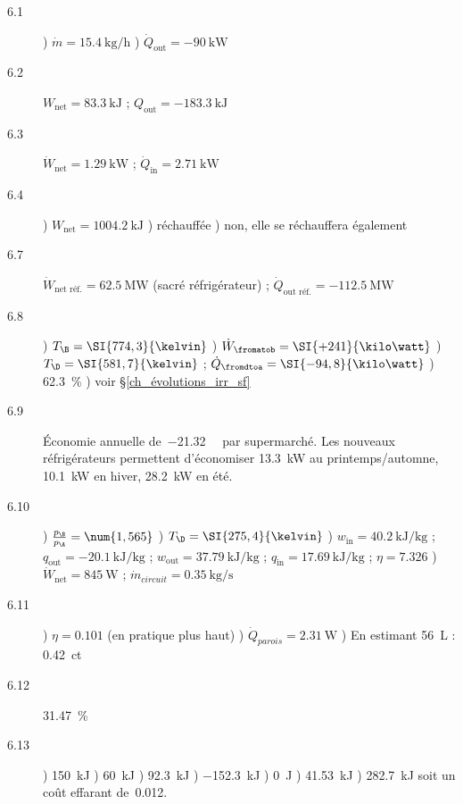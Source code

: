 	\begin{description}
		\item [6.1] ) $\dot{m} = \SI{15,4}{\kilogram\per\hour}$ 
						) $\dot{Q}_\text{out} = \SI{-90}{\kilo\watt}$
		\item [6.2] \tab ${W}_\text{net} = \SI{+83,3}{\kilo\joule}$ ; $Q_\text{out} = \SI{-183,3}{\kilo\joule}$
		\item [6.3] \tab $\dot{W}_\text{net} = \SI{+1,29}{\kilo\watt}$ ; $\dot{Q}_\text{in} = \SI{+2,71}{\kilo\watt}$
		\item [6.4]	) ${W}_\text{net} = \SI{+1004,2}{\kilo\joule}$
						) réchauffée
						) non, elle se réchauffera également
		\item [6.7] \tab $\dot{W}_\text{net réf.} = \SI{+62,5}{\mega\watt}$ (sacré réfrigérateur) ; $\dot{Q}_\text{out réf.} = \SI{-112,5}{\mega\watt}$
		\item [6.8] ) $T_\B = \SI{774,3}{\kelvin}$ 
						) $\dot{W}_\fromatob = \SI{+241}{\kilo\watt}$ 
						) $T_\D = \SI{581,7}{\kelvin}$ ; $\dot{Q}_\fromdtoa = \SI{-94,8}{\kilo\watt}$ 
						) \SI{62,3}{\percent} 
						) voir \S\ref{ch_évolutions_irr_sf}
		\item [6.9] \tab Économie annuelle de~\SI{-21,32}{\kilo\euroo} par supermarché. Les nouveaux réfrigérateurs permettent d’économiser \SI{13,3}{\kilo\watt} au printemps/automne, \SI{10,1}{\kilo\watt} en hiver, \SI{28,2}{\kilo\watt} en été.
		\item [6.10] 	) $\frac{p_\B }{p_\A} = \num{1,565}$ 
							) $T_\D = \SI{275,4}{\kelvin}$ 
							) $w_\text{in} = \SI{+40,2}{\kilo\joule\per\kilogram}$ ; $q_\text{out} = \SI{-20,1}{\kilo\joule\per\kilogram}$ ; $w_\text{out} = \SI{+37,79}{\kilo\joule\per\kilogram}$ ; $q_\text{in} = \SI{+17,69}{\kilo\joule\per\kilogram}$ ; $\eta = \num{7,326}$ 
							) $\dot{W}_\text{net} = \SI{+845}{\watt}$ ; $\dot{m}_{circuit} = \SI{0,35}{\kilogram\per\second}$
		\item [6.11] 	) $\eta = \num{0,101}$ (en pratique plus haut) 
							) $\dot{Q}_{parois} = \SI{2,31}{\watt}$ 
							) En estimant \SI{56}{\liter} : \SI{0,42}{ct}
		\item [6.12] \tab \SI{31,47}{\percent}
		\item [6.13] 	) \SI{150}{\kilo\joule} 
							) \SI{60}{\kilo\joule} 
							) \SI{92,3}{\kilo\joule} 
							) \SI{-152,3}{\kilo\joule} 
							) \SI{0}{\joule} 
							) \SI{41,53}{\kilo\joule} 
							) \SI{282,7}{\kilo\joule} soit un coût effarant de~\SI{0,012}{\euroo}.
	\end{description}
